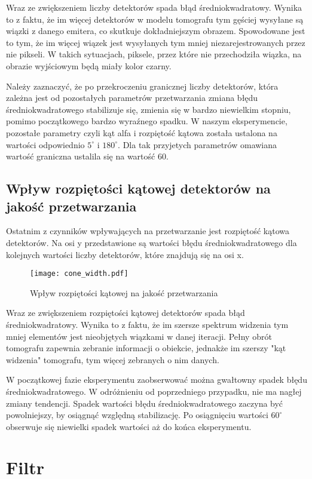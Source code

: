 \documentclass{article}
\begin{document}
Wraz ze zwiększeniem liczby detektorów spada błąd średniokwadratowy. Wynika to z faktu, że im więcej detektorów w modelu tomografu tym gęściej wysyłane są wiązki z danego emitera, co skutkuje dokładniejszym obrazem. Spowodowane jest to tym, że im więcej wiązek jest wysyłanych tym mniej niezarejestrowanych przez nie pikseli. W takich sytuacjach, piksele, przez które nie przechodziła wiązka, na obrazie wyjściowym będą miały kolor czarny.

Należy zaznaczyć, że po przekroczeniu granicznej liczby detektorów, która zależna jest od pozostałych parametrów przetwarzania zmiana błędu średniokwadratowego stabilizuje się, zmienia się w bardzo niewielkim stopniu, pomimo początkowego bardzo wyraźnego spadku.
W naszym eksperymencie, pozostałe parametry czyli kąt alfa i rozpiętość kątowa została ustalona na wartości odpowiednio $5 ^{\circ}$ i $180 ^{\circ}$. Dla tak przyjetych parametrów omawiana wartość graniczna ustalila się na wartość 60. 

\subsection{Wpływ rozpiętości kątowej detektorów na jakość przetwarzania}
\label{subsec_cone_width_comparison}

Ostatnim z czynników wpływających na przetwarzanie jest rozpiętość kątowa detektorów. Na osi y przedstawione są wartości błędu średniokwadratowego dla kolejnych wartości liczby detektorów, które znajdują się na osi x.

\begin{figure}[!htbp]
\begin{center}
\texttt{[image: cone\_width.pdf]}
\end{center}
\caption{Wpływ rozpiętości kątowej na jakość przetwarzania}
\label{fig:cone_width}
\end{figure}

Wraz ze zwiększeniem rozpiętości kątowej detektorów spada błąd średniokwadratowy. Wynika to z  faktu, że im szersze spektrum widzenia tym mniej elementów jest nieobjętych wiązkami w danej iteracji. Pełny obrót tomografu zapewnia zebranie informacji o obiekcie, jednakże im szerszy "kąt widzenia" tomografu, tym więcej zebranych o nim danych.

W początkowej fazie eksperymentu zaobserwować można gwałtowny spadek błędu średniokwadratowego. W odróżnieniu od poprzedniego przypadku, nie ma nagłej zmiany tendencji. Spadek wartości błędu średniokwadratowego zaczyna być powolniejszy, by osiągnąć względną stabilizację. Po osiągnięciu wartości $60^{\circ}$ obserwuje się niewielki spadek wartości aż do końca eksperymentu.

\section{Filtr}




\end{document}

